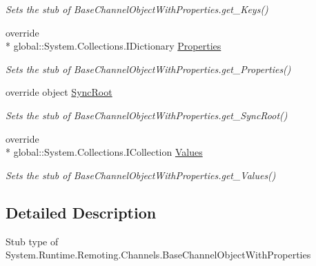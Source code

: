 \begin{DoxyCompactItemize}
\begin{DoxyCompactList}\small\item\em Sets the stub of Base\-Channel\-Object\-With\-Properties.\-get\-\_\-\-Keys()\end{DoxyCompactList}\item 
override \\*
global\-::\-System.\-Collections.\-I\-Dictionary \hyperlink{class_system_1_1_runtime_1_1_remoting_1_1_channels_1_1_fakes_1_1_stub_base_channel_object_with_properties_a0f6206ec4833d2b004bf1221b58565a1}{Properties}
\begin{DoxyCompactList}\small\item\em Sets the stub of Base\-Channel\-Object\-With\-Properties.\-get\-\_\-\-Properties()\end{DoxyCompactList}\item 
override object \hyperlink{class_system_1_1_runtime_1_1_remoting_1_1_channels_1_1_fakes_1_1_stub_base_channel_object_with_properties_a3bc1b63003b4813a1eb681725da7ad34}{Sync\-Root}
\begin{DoxyCompactList}\small\item\em Sets the stub of Base\-Channel\-Object\-With\-Properties.\-get\-\_\-\-Sync\-Root()\end{DoxyCompactList}\item 
override \\*
global\-::\-System.\-Collections.\-I\-Collection \hyperlink{class_system_1_1_runtime_1_1_remoting_1_1_channels_1_1_fakes_1_1_stub_base_channel_object_with_properties_a4ff9dcb5f3714c89e7e91e61f46f4042}{Values}
\begin{DoxyCompactList}\small\item\em Sets the stub of Base\-Channel\-Object\-With\-Properties.\-get\-\_\-\-Values()\end{DoxyCompactList}\end{DoxyCompactItemize}


\subsection{Detailed Description}
Stub type of System.\-Runtime.\-Remoting.\-Channels.\-Base\-Channel\-Object\-With\-Properties



